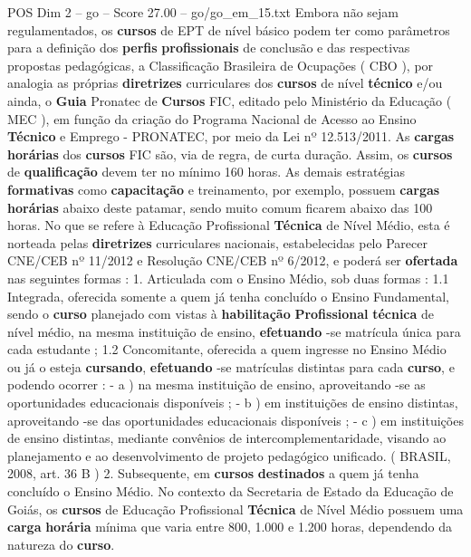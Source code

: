 \begin{textsample}{POS Dim 2 – go – Score 27.00 – go/go\_em\_15.txt}
Embora não sejam regulamentados, os \textbf{cursos} de EPT de nível básico podem ter como parâmetros para a definição dos \textbf{perfis} \textbf{profissionais} de conclusão e das respectivas propostas pedagógicas, a Classificação Brasileira de Ocupações ( CBO ), por analogia as próprias \textbf{diretrizes} curriculares dos \textbf{cursos} de nível \textbf{técnico} e/ou ainda, o \textbf{Guia} Pronatec de \textbf{Cursos} FIC, editado pelo Ministério da Educação ( MEC ), em função da criação do Programa Nacional de Acesso ao Ensino \textbf{Técnico} e Emprego - PRONATEC, por meio da Lei nº 12.513/2011.
As \textbf{cargas} \textbf{horárias} dos \textbf{cursos} FIC são, via de regra, de curta duração.
Assim, os \textbf{cursos} de \textbf{qualificação} devem ter no mínimo 160 horas.
As demais estratégias \textbf{formativas} como \textbf{capacitação} e treinamento, por exemplo, possuem \textbf{cargas} \textbf{horárias} abaixo deste patamar, sendo muito comum ficarem abaixo das 100 horas.
No que se refere à Educação Profissional \textbf{Técnica} de Nível Médio, esta é norteada pelas \textbf{diretrizes} curriculares nacionais, estabelecidas pelo Parecer CNE/CEB nº 11/2012 e Resolução CNE/CEB nº 6/2012, e poderá ser \textbf{ofertada} nas seguintes formas : 1.
Articulada com o Ensino Médio, sob duas formas : 1.1 Integrada, oferecida somente a quem já tenha concluído o Ensino Fundamental, sendo o \textbf{curso} planejado com vistas à \textbf{habilitação} \textbf{Profissional} \textbf{técnica} de nível médio, na mesma instituição de ensino, \textbf{efetuando} -se matrícula única para cada estudante ; 1.2 Concomitante, oferecida a quem ingresse no Ensino Médio ou já o esteja \textbf{cursando}, \textbf{efetuando} -se matrículas distintas para cada \textbf{curso}, e podendo ocorrer : - a ) na mesma instituição de ensino, aproveitando -se as oportunidades educacionais disponíveis ; - b ) em instituições de ensino distintas, aproveitando -se das oportunidades educacionais disponíveis ; - c ) em instituições de ensino distintas, mediante convênios de intercomplementaridade, visando ao planejamento e ao desenvolvimento de projeto pedagógico unificado. ( BRASIL, 2008, art. 36 B ) 2.
Subsequente, em \textbf{cursos} \textbf{destinados} a quem já tenha concluído o Ensino Médio.
No contexto da Secretaria de Estado da Educação de Goiás, os \textbf{cursos} de Educação Profissional \textbf{Técnica} de Nível Médio possuem uma \textbf{carga} \textbf{horária} mínima que varia entre 800, 1.000 e 1.200 horas, dependendo da natureza do \textbf{curso}.

\end{textsample}
